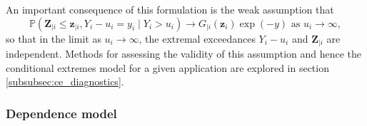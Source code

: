 \documentclass{article}
\numberwithin{equation}{section}
\begin{document}
An important consequence of this formulation is the weak assumption that
\begin{equation} \label{eq:limit_independence}
\mathbb{P}(\bm{Z}_{\mid i} \le \bm{z}_{\mid i}, Y_i - u_i = y_i \mid Y_i > u_i) \rightarrow G_{\mid i}(\bm{z}_i) \exp(-y) \text{ as } u_i \rightarrow \infty,
\end{equation}
so that in the limit as $u_i \to \infty$, the extremal exceedances $Y_i - u_i$ and $\bm{Z}_{\mid i}$ are independent.
Methods for assessing the validity of this assumption and hence the conditional extremes model for a given application are explored in section \ref{subsubsec:ce_diagnostics}.


\subsubsection{Dependence model} \label{subsubsec:dep_model}





\end{document}
